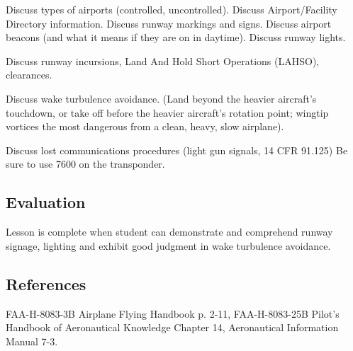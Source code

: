 Discuss types of airports (controlled, uncontrolled). Discuss Airport/Facility
Directory information. Discuss runway markings and signs. Discuss airport
beacons (and what it means if they are on in daytime). Discuss runway lights.

Discuss runway incursions, Land And Hold Short Operations (LAHSO), clearances.

Discuss wake turbulence avoidance. (Land beyond the heavier aircraft's
touchdown, or take off before the heavier aircraft's rotation point; wingtip
vortices the most dangerous from a clean, heavy, slow airplane).

Discuss lost communications procedures (light gun signals, 14 CFR 91.125) Be
sure to use 7600 on the transponder.

\subsection{Evaluation}

Lesson is complete when student can demonstrate and comprehend runway signage,
lighting and exhibit good judgment in wake turbulence avoidance.

\subsection{References}

FAA-H-8083-3B Airplane Flying Handbook p. 2-11, FAA-H-8083-25B Pilot's Handbook
of Aeronautical Knowledge Chapter 14, Aeronautical Information Manual 7-3.

